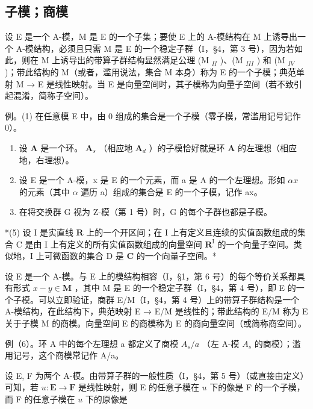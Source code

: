 \subsection{子模；商模}

设 E 是一个 A-模，M 是 E 的一个子集；要使 E 上的 A-模结构在 M 上诱导出一个 A-模结构，必须且只需 M 是 E 的一个稳定子群（I，§4，第 3 号），因为若如此，则在 M 上诱导出的带算子群结构显然满足公理 (M \(_{II}\) )、(M \(_{III}\) ) 和 (M \(_{IV}\) )；带此结构的 M（或者，滥用说法，集合 M 本身）称为 E 的一个子模；典范单射 M → E 是线性映射。当 E 是向量空间时，其子模称为向量子空间（若不致引起混淆，简称子空间）。

例。(1) 在任意模 E 中，由 0 组成的集合是一个子模（零子模，常滥用记号记作 0）。

\begin{enumerate}
\def\labelenumi{(\arabic{enumi})}
\setcounter{enumi}{1}
\item
  设 \(\mathbf{A}\) 是一个环。 \(\mathbf{A}_s\) （相应地 \(\mathbf{A}_d\) ）的子模恰好就是环 \(\mathbf{A}\) 的左理想（相应地，右理想）。
\item
  设 E 是一个 A-模，x 是 E 的一个元素，而 a 是 A 的一个左理想。形如 \(\alpha x\) 的元素（其中 \(\alpha\) 遍历 a）组成的集合是 E 的一个子模，记作 ax。
\item
  在将交换群 G 视为 Z-模（第 1 号）时，G 的每个子群也都是子模。
\end{enumerate}

*(5) 设 I 是实直线 \(\mathbf{R}\) 上的一个开区间；在 I 上有定义且连续的实值函数组成的集合 C 是由 I 上有定义的所有实值函数组成的向量空间 \(\mathbf{R}^{\mathrm{I}}\) 的一个向量子空间。类似地，I 上可微函数的集合 D 是 \(\mathbf{C}\) 的一个向量子空间。*

设 E 是一个 A-模。与 E 上的模结构相容（I，§1，第 6 号）的每个等价关系都具有形式 \(x - y \in \mathbf{M}\) ，其中 M 是 E 的一个稳定子群（I，§4，第 4 号），即 E 的一个子模。可以立即验证，商群 E/M（I，§4，第 4 号）上的带算子群结构是一个 A-模结构，在此结构下，典范映射 E → E/M 是线性的；带此结构的 E/M 称为 E 关于子模 M 的商模。向量空间 E 的商模称为 E 的商向量空间（或简称商空间）。

例（6）。环 A 中的每个左理想 a 都定义了商模 \(A_{s}/a\) （左 A-模 \(A_{s}\) 的商模）；滥用记号，这个商模常记作 A/a。

设 E, F 为两个 A-模。由带算子群的一般性质（I，§4，第 5 号）（或直接由定义）可知，若 \(u: \mathbf{E} \to \mathbf{F}\) 是线性映射，则 E 的任意子模在 \(u\) 下的像是 F 的一个子模，而 F 的任意子模在 \(u\) 下的原像是

